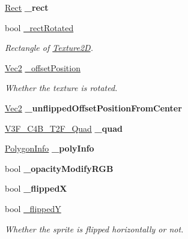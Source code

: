 \begin{DoxyCompactItemize}
\hyperlink{classRect}{Rect} {\bfseries \+\_\+rect}
\item 
\mbox{\label{classSprite_a186ca86337296390f4587d5d615f38aa}} 
bool \hyperlink{classSprite_a186ca86337296390f4587d5d615f38aa}{\+\_\+rect\+Rotated}
\begin{DoxyCompactList}\small\item\em Rectangle of \hyperlink{classTexture2D}{Texture2D}. \end{DoxyCompactList}\item 
\hyperlink{classVec2}{Vec2} \hyperlink{classSprite_af69eb91c3b11ea5f42c6143be302edb1}{\+\_\+offset\+Position}
\begin{DoxyCompactList}\small\item\em Whether the texture is rotated. \end{DoxyCompactList}\item 
\mbox{\label{classSprite_aab00cc0e63779a48069ba5c95bb955a0}} 
\hyperlink{classVec2}{Vec2} {\bfseries \+\_\+unflipped\+Offset\+Position\+From\+Center}
\item 
\mbox{\label{classSprite_a86bc1ec1aae908533ed61f3c79bc1f15}} 
\hyperlink{structV3F__C4B__T2F__Quad}{V3\+F\+\_\+\+C4\+B\+\_\+\+T2\+F\+\_\+\+Quad} {\bfseries \+\_\+quad}
\item 
\mbox{\label{classSprite_a66a9a91b8efab7570db0465537d4c6b9}} 
\hyperlink{classPolygonInfo}{Polygon\+Info} {\bfseries \+\_\+poly\+Info}
\item 
\mbox{\label{classSprite_a666f9f4084e69cbbc7fcbf9df3beb2ac}} 
bool {\bfseries \+\_\+opacity\+Modify\+R\+GB}
\item 
\mbox{\label{classSprite_ab5d97704a51648b2a59be60e7c94899a}} 
bool {\bfseries \+\_\+flippedX}
\item 
\mbox{\label{classSprite_af345b6408a8b058ab9be68a47b0aa72a}} 
bool \hyperlink{classSprite_af345b6408a8b058ab9be68a47b0aa72a}{\+\_\+flippedY}
\begin{DoxyCompactList}\small\item\em Whether the sprite is flipped horizontally or not. \end{DoxyCompactList}\item 

\end{DoxyCompactItemize}
